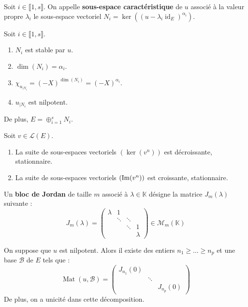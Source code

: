 	\begin{definition}
		Soit $i \in \llbracket 1, s \rrbracket$. On appelle \textbf{sous-espace caractéristique} de $u$ associé à la valeur propre $\lambda_i$ le sous-espace vectoriel $N_i = \ker((u-\lambda_i \operatorname{id}_E)^{\alpha_i})$.
	\end{definition}
	
	\begin{proposition}
		Soit $i \in \llbracket 1, s \rrbracket$.
		\begin{enumerate}[label=(\roman*)]
			\item $N_i$ est stable par $u$.
			\item $\dim(N_i) = \alpha_i$.
			\item $\chi_{u_{|N_i}} = (-X)^{\dim(N_i)} = (-X)^{\alpha_i}$.
			\item $u_{|N_i}$ est nilpotent.
		\end{enumerate}
		De plus, $E = \oplus_{i=1}^s N_i$.
	\end{proposition}
	
	\begin{proposition}
		Soit $v \in \mathcal{L}(E)$.
		\begin{enumerate}[label=(\roman*)]
			\item La suite de sous-espaces vectoriels $(\ker(v^n))$ est décroissante, stationnaire.
			\item La suite de sous-espaces vectoriels $(\mathrm{Im}(v^n))$ est croissante, stationnaire.
		\end{enumerate}
	\end{proposition}
	
	
	\begin{definition}
		Un \textbf{bloc de Jordan} de taille $m$ associé à $\lambda \in \mathbb{K}$ désigne la matrice $J_m(\lambda)$ suivante :
		\[ J_m(\lambda) = \begin{pmatrix} \lambda & 1 & \\ & \ddots & \ddots & \\ & & \ddots & 1 \\ & & & \lambda \end{pmatrix} \in \mathcal{M}_m(\mathbb{K}) \]
	\end{definition}
	
	\begin{application}
		On suppose que $u$ est nilpotent. Alors il existe des entiers $n_1 \geq \dots \geq n_p$ et une base $\mathcal{B}$ de $E$ tels que :
		\[ \operatorname{Mat}(u, \mathcal{B}) = \begin{pmatrix} J_{n_1}(0) & & \\ & \ddots & \\ & & J_{n_p}(0) \end{pmatrix} \]
		De plus, on a unicité dans cette décomposition.
	\end{application}
	

